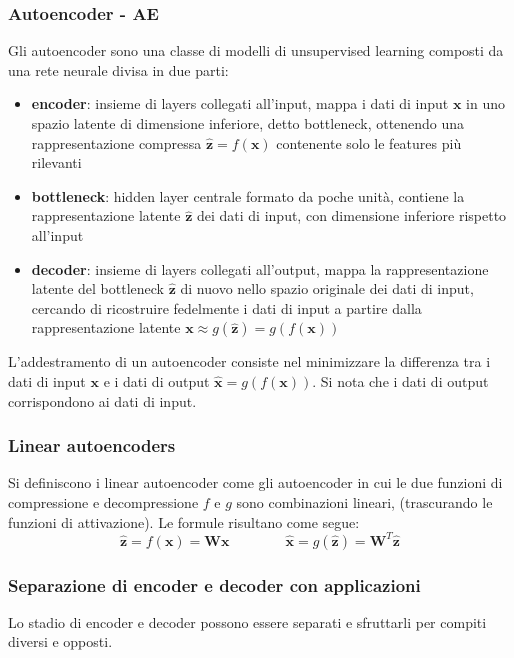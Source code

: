 \subsubsection*{Autoencoder - AE}
Gli autoencoder sono una classe di modelli di unsupervised learning composti da una rete neurale divisa in due parti:
\begin{itemize}
	\item \textbf{encoder}: insieme di layers collegati all'input, mappa i dati di input \(\textbf{x}\) in uno spazio latente
	di dimensione inferiore, detto bottleneck, ottenendo una rappresentazione compressa \(\hat{\textbf{z}} = f(\textbf{x})\)
	contenente solo le features più rilevanti
	\item \textbf{bottleneck}: hidden layer centrale formato da poche unità, contiene la rappresentazione latente
	\(\hat{\textbf{z}}\) dei dati di input, con dimensione inferiore rispetto all'input
	\item \textbf{decoder}: insieme di layers collegati all'output, mappa la rappresentazione latente del bottleneck \(\hat{\textbf{z}}\)
	di nuovo nello spazio originale dei dati di input, cercando di ricostruire fedelmente i dati di input a partire dalla
	rappresentazione latente \(\textbf{x} \approx g(\hat{\textbf{z}}) = g(f(\textbf{x}))\)
\end{itemize}
L'addestramento di un autoencoder consiste nel minimizzare la differenza tra i dati di input \(\textbf{x}\) e i dati di output
\(\hat{\textbf{x}} = g(f(\textbf{x}))\). Si nota che i dati di output corrispondono ai dati di input.

\subsubsection*{Linear autoencoders}
Si definiscono i linear autoencoder come gli autoencoder in cui le due funzioni di compressione e decompressione \(f\) e \(g\)
sono combinazioni lineari, (trascurando le funzioni di attivazione). Le formule risultano come segue:
\[\hat{\textbf{z}} = f(\textbf{x}) = \textbf{W} \textbf{x} \qquad\qquad \hat{\textbf{x}} = g(\hat{\textbf{z}}) = \textbf{W}^T \hat{\textbf{z}}\]

\subsubsection*{Separazione di encoder e decoder con applicazioni}
Lo stadio di encoder e decoder possono essere separati e sfruttarli per compiti diversi e opposti.

